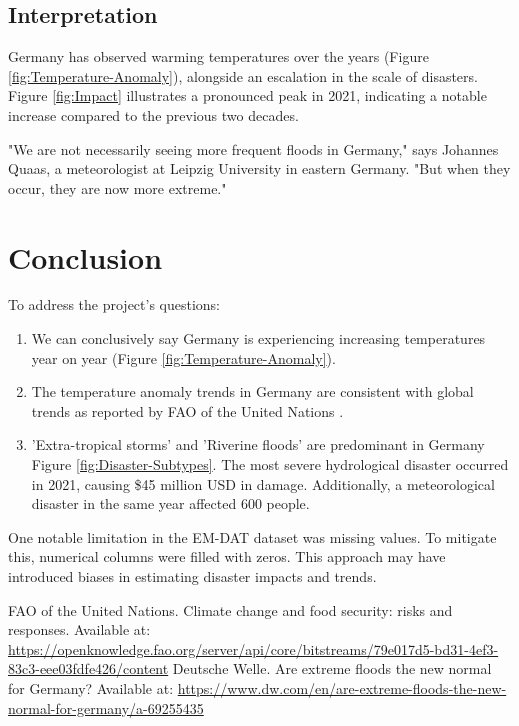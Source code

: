 \documentclass{article}
\begin{document}
\subsection{Interpretation}

Germany has observed warming temperatures over the years (Figure \ref{fig:Temperature-Anomaly}), alongside an escalation in the scale of disasters. Figure \ref{fig:Impact} illustrates a pronounced peak in 2021, indicating a notable increase compared to the previous two decades.

"We are not necessarily seeing more frequent floods in Germany," says Johannes Quaas, a meteorologist at Leipzig University in eastern Germany. "But when they occur, they are now more extreme." \cite{DWArticle}


\section{Conclusion}

To address the project's questions:
\begin{enumerate}
    \item We can conclusively say Germany is experiencing increasing temperatures year on year (Figure \ref{fig:Temperature-Anomaly}).
    
    \item The temperature anomaly trends in Germany are consistent with global trends as reported by FAO of the United Nations \cite{FAOReport}.
    
    \item \begin{minipage}[t]{\linewidth}
          'Extra-tropical storms' and 'Riverine floods' are predominant in Germany Figure \ref{fig:Disaster-Subtypes}. The most severe hydrological disaster occurred in 2021, causing \$45 million USD in damage. Additionally, a meteorological disaster in the same year affected 600 people.
          \end{minipage}
\end{enumerate}

One notable limitation in the EM-DAT dataset was missing values. To mitigate this, numerical columns were filled with zeros. This approach may have introduced biases in estimating disaster impacts and trends. 



\begin{thebibliography}{9}
 FAO of the United Nations. Climate change and food security: risks and responses. Available at: \url{https://openknowledge.fao.org/server/api/core/bitstreams/79e017d5-bd31-4ef3-83c3-eee03fdfe426/content}
 Deutsche Welle. Are extreme floods the new normal for Germany? Available at: \url{https://www.dw.com/en/are-extreme-floods-the-new-normal-for-germany/a-69255435}
\end{thebibliography}
\end{document}
